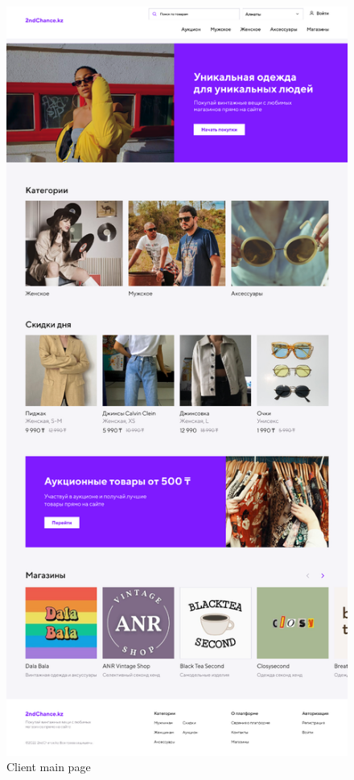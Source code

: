 \begin{figure}[pt!]
    \centering
    \includegraphics[scale=0.33]{figures/image007.png}
    \caption{Client main page}
    \label{fig:image007}
\end{figure}
\clearpage
